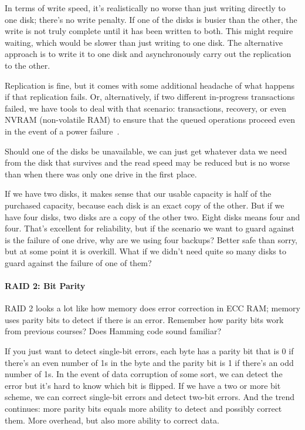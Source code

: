 In terms of write speed, it's realistically no worse than just writing directly to one disk; there's no write penalty. If one of the disks is busier than the other, the write is not truly complete until it has been written to both. This might require waiting, which would be slower than just writing to one disk. The alternative approach is to write it to one disk and asynchronously carry out the replication to the other. 

Replication is fine, but it comes with some additional headache of what happens if that replication fails. Or, alternatively, if two different in-progress transactions failed, we have tools to deal with that scenario: transactions, recovery, or even NVRAM (non-volatile RAM) to ensure that the queued operations proceed even in the event of a power failure~\cite{osc}.

Should one of the disks be unavailable, we can just get whatever data we need from the disk that survives and the read speed may be reduced but is no worse than when there was only one drive in the first place.

If we have two disks, it makes sense that our usable capacity is half of the purchased capacity, because each disk is an exact copy of the other. But if we have four disks, two disks are a copy of the other two. Eight disks means four and four. That's excellent for reliability, but if the scenario we want to guard against is the failure of one drive, why are we using four backups? Better safe than sorry, but at some point it is overkill. What if we didn't need quite so many disks to guard against the failure of one of them?

\paragraph{RAID 2: Bit Parity}
RAID 2 looks a lot like how memory does error correction in ECC RAM; memory uses parity bits to detect if there is an error. Remember how parity bits work from previous courses? Does Hamming code sound familiar?

If you just want to detect single-bit errors, each byte has a parity bit that is 0 if there's an even number of 1s in the byte and the parity bit is 1 if there's an odd number of 1s. In the event of data corruption of some sort, we can detect the error but it's hard to know which bit is flipped. If we have a two or more bit scheme, we can correct single-bit errors and detect two-bit errors. And the trend continues: more parity bits equals more ability to detect and possibly correct them. More overhead, but also more ability to correct data.

